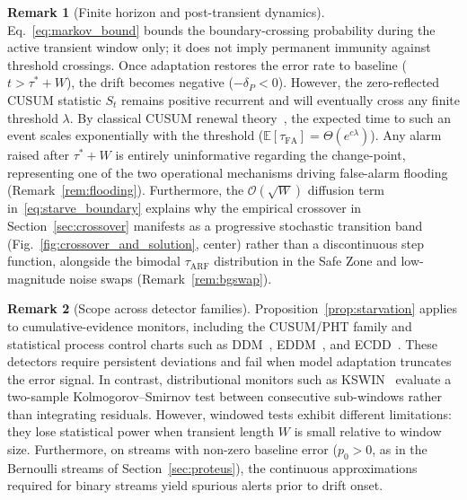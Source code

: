 \documentclass[10pt,conference]{IEEEtran}
\theoremstyle{definition}
\newtheorem{remark}{Remark}
\begin{document}
\begin{remark}[Finite horizon and post-transient dynamics]\label{rem:sufficient}
  Eq.~\eqref{eq:markov_bound} bounds the boundary-crossing probability during the active transient window only; it does not imply permanent immunity against threshold crossings. Once adaptation restores the error rate to baseline ($t > \tau^* + W$), the drift becomes negative ($-\delta_P < 0$). However, the zero-reflected CUSUM statistic $S_t$ remains positive recurrent and will eventually cross any finite threshold $\lambda$. By classical CUSUM renewal theory~\cite{tartakovsky_2014,page_1954}, the expected time to such an event scales exponentially with the threshold ($\mathbb{E}[\tau_{\mathrm{FA}}] = \Theta(e^{c \lambda})$). Any alarm raised after $\tau^* + W$ is entirely uninformative regarding the change-point, representing one of the two operational mechanisms driving false-alarm flooding (Remark~\ref{rem:flooding}). Furthermore, the $\mathcal{O}(\sqrt{W})$ diffusion term in~\eqref{eq:starve_boundary} explains why the empirical crossover in Section~\ref{sec:crossover} manifests as a progressive stochastic transition band (Fig.~\ref{fig:crossover_and_solution}, center) rather than a discontinuous step function, alongside the bimodal $\tau_{\mathrm{ARF}}$ distribution in the Safe Zone and low-magnitude noise swaps (Remark~\ref{rem:bgswap}).
\end{remark}

\begin{remark}[Scope across detector families]\label{rem:agnostic}
  Proposition~\ref{prop:starvation} applies to cumulative-evidence monitors, including the CUSUM/PHT family and statistical process control charts such as DDM~\cite{gama_ddm_2004}, EDDM~\cite{baena_eddm_2006}, and ECDD~\cite{ross_ecdd_2012}. These detectors require persistent deviations and fail when model adaptation truncates the error signal. In contrast, distributional monitors such as KSWIN~\cite{raab_kswin_2020} evaluate a two-sample Kolmogorov--Smirnov test between consecutive sub-windows rather than integrating residuals. However, windowed tests exhibit different limitations: they lose statistical power when transient length $W$ is small relative to window size. Furthermore, on streams with non-zero baseline error ($p_0 > 0$, as in the Bernoulli streams of Section~\ref{sec:proteus}), the continuous approximations required for binary streams yield spurious alerts prior to drift onset.
\end{remark}
\end{document}
